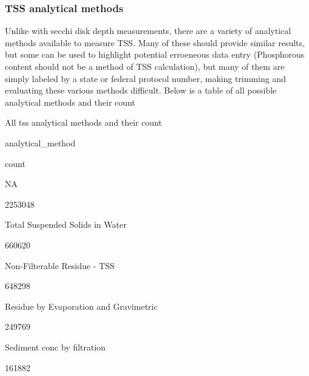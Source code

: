 \documentclass[]{article}
\newenvironment{Shaded}{\begin{snugshade}}{\end{snugshade}}
\newcommand{\DataTypeTok}[1]{\textcolor[rgb]{0.13,0.29,0.53}{#1}}
\newcommand{\KeywordTok}[1]{\textcolor[rgb]{0.13,0.29,0.53}{\textbf{#1}}}
\newcommand{\NormalTok}[1]{#1}
\newcommand{\OperatorTok}[1]{\textcolor[rgb]{0.81,0.36,0.00}{\textbf{#1}}}
\newcommand{\StringTok}[1]{\textcolor[rgb]{0.31,0.60,0.02}{#1}}
\begin{document}
\hypertarget{tss-analytical-methods}{%
\subsubsection{TSS analytical methods}\label{tss-analytical-methods}}

Unlike with secchi disk depth measurements, there are a variety of
analytical methods available to measure TSS. Many of these should
provide similar results, but some can be used to highlight potential
erroeneous data entry (Phosphorous content should not be a method of TSS
calculation), but many of them are simply labeled by a state or federal
protocol number, making trimming and evaluating these various methods
difficult. Below is a table of all possible analytical methods and their
count

\begin{Shaded}
\end{Shaded}

All tss analytical methods and their count

analytical\_method

count

NA

2253048

Total Suspended Solids in Water

660620

Non-Filterable Residue - TSS

648298

Residue by Evaporation and Gravimetric

249769

Sediment conc by filtration

161882
\end{document}
